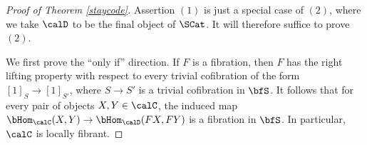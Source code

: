 \begin{Simplicial Categories}


\begin{proof}[Proof of Theorem \ref{staycode}]
Assertion $(1)$ is just a special case of $(2)$, where we take $\calD$ to be the final object
of $\SCat$. It will therefore suffice to prove $(2)$. 

We first prove the ``only if'' direction.
If $F$ is a fibration, then $F$ has the right lifting property with respect to every
trivial cofibration of the form $[1]_{S} \rightarrow [1]_{S'}$, where $S \rightarrow S'$ is
a trivial cofibration in $\bfS$. It follows that for every pair of objects $X, Y \in \calC$, 
the induced map $\bHom_{\calC}(X,Y) \rightarrow \bHom_{\calD}(FX, FY)$ is a fibration in $\bfS$.
In particular, $\calC$ is locally fibrant.


\end{proof}
\end{Simplicial Categories}

